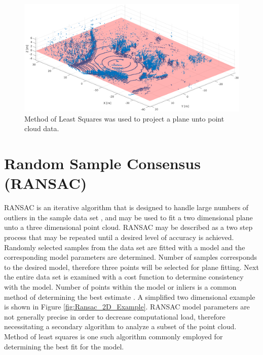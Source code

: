 \documentclass[numbered,pdftex]{ohio-etd}
\begin{document}
{{		\begin{figure}[H]
			\centering
			\includegraphics[width=0.7\linewidth]{Defense_Images/Method_Least_Squares_Plane_Proj.png}
			\caption[Method of Least Squares Plane Projection Example]{Method of Least Squares was used to project a plane unto point cloud data.}
			\label{fig:Method_Least_Squares_Plane_Proj}
		\end{figure}
		
	} %
	
	\section{Random Sample Consensus (RANSAC)}{
	
		{RANSAC is an iterative algorithm that is designed to handle large numbers of outliers in the sample data set \cite{derpanis_overview_nodate,yaniv_random_2010,fischler_random_1987,cantzler_random_nodate}, and may be used to fit a two dimensional plane unto a three dimensional point cloud. RANSAC may be described as a two step process that may be repeated until a desired level of accuracy is achieved. Randomly selected samples from the data set are fitted with a model and the corresponding model parameters are determined. Number of samples corresponds to the desired model, therefore three points will be selected for plane fitting. Next the entire data set is examined with a cost function to determine consistency with the model. Number of points within the model or inliers is a common method of determining the best estimate \cite{cantzler_random_nodate}. A simplified two dimensional example is shown in Figure \ref{fig:Ransac_2D_Example}. RANSAC model parameters are not generally precise in order to decrease computational load, therefore necessitating a secondary algorithm to analyze a subset of the point cloud. Method of least squares is one such algorithm commonly employed for determining the best fit for the model.}

}}
\end{document}
